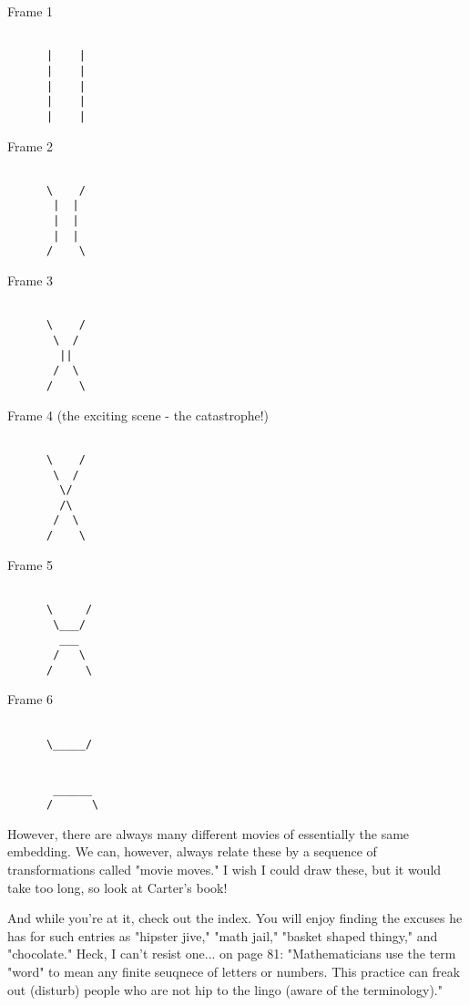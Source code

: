 Frame 1


\begin{verbatim}

      |    |
      |    |
      |    |
      |    |
      |    |
\end{verbatim}
    

Frame 2 


\begin{verbatim}

      \    /
       |  |
       |  |
       |  |
      /    \
\end{verbatim}
    

Frame 3


\begin{verbatim}

      \    /
       \  /
        ||
       /  \
      /    \
\end{verbatim}
    

Frame 4 (the exciting scene - the catastrophe!)


\begin{verbatim}

      \    /
       \  /
        \/
        /\
       /  \
      /    \
\end{verbatim}
    

Frame 5


\begin{verbatim}

      \     /
       \___/
        ___
       /   \
      /     \
\end{verbatim}
    

Frame 6


\begin{verbatim}

      \_____/
      
      
       ______     
      /      \
\end{verbatim}
    

However, there are always many different movies of essentially the same
embedding.  We can, however, always relate these by a sequence of
transformations called "movie moves."  I wish I could draw these, but it
would take too long, so look at Carter's book!  

And while you're at it, check out the index.  You will enjoy finding the
excuses he has for such entries as "hipster jive," "math jail," "basket
shaped thingy," and "chocolate."  Heck, I can't resist one... on page
81: "Mathematicians use the term "word" to mean any finite seuqnece of
letters or numbers.  This practice can freak out (disturb) people who
are not hip to the lingo (aware of the terminology)."

